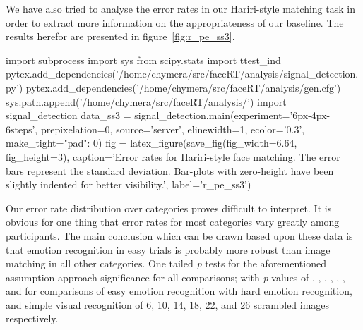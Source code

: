 	    We have also tried to analyse the error rates in our Hariri-style matching task in order to extract more information on the appropriateness of our baseline.
	    The results herefor are presented in figure~\ref{fig:r_pe_ss3}.
	    \begin{pycode}
		import subprocess
		import sys
		from scipy.stats import ttest_ind
		pytex.add_dependencies('/home/chymera/src/faceRT/analysis/signal_detection.py')
		pytex.add_dependencies('/home/chymera/src/faceRT/analysis/gen.cfg')
		sys.path.append('/home/chymera/src/faceRT/analysis/')
		import signal_detection
		data_ss3 = signal_detection.main(experiment='6px-4px-6steps', prepixelation=0, source='server', elinewidth=1, ecolor='0.3', make_tight={"pad": 0})
		fig = latex_figure(save_fig(fig_width=6.64, fig_height=3), caption='Error rates for Hariri-style face matching. The error bars represent the standard deviation. Bar-plots with zero-height have been slightly indented for better visibility.', label='r_pe_ss3')
	    \end{pycode}
	    
	    Our error rate distribution over categories proves difficult to interpret.
	    It is obvious for one thing that error rates for most categories vary greatly among participants.
	    The main conclusion which can be drawn based upon these data is that emotion recognition in easy trials is probably more robust than image matching in all other categories.
	    One tailed \textit{p} tests for the aforementioned assumption approach significance for all comparisons; 
	    with \textit{p} values of 
	    ,
	    ,
	    ,
	    ,
	    ,
	    , and
	    for comparisons of easy emotion recognition with hard emotion recognition, and simple visual recognition of \SI{6}{\pixel}, \SI{10}{\pixel}, \SI{14}{\pixel}, \SI{18}{\pixel}, \SI{22}{\pixel}, and \SI{26}{\pixel} scrambled images respectively.
	    
